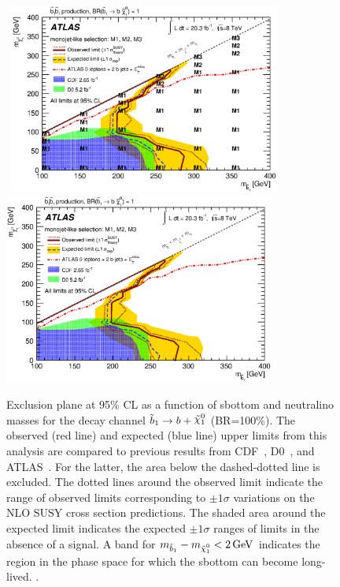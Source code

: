 \begin{figure}[!ht]
\begin{center}
\mbox{
\includegraphics[width=0.795\textwidth]{Interpretations/Figures/limitPlotSbottom_Stop_combined_M1_M2_M3_BestRegion.eps}
}
\mbox{
\includegraphics[width=0.795\textwidth]{Interpretations/Figures/limitPlotSbottom_Stop_combined_M1_M2_M3_.eps}
}
\end{center}
\caption[Exclusion plane at 95\% CL for sbottom pair production with $\sbottomtob$ as a function of the $m_{\sbottom}$ and $m_{\ninoone}$]{Exclusion plane at 95\% CL as a function of sbottom and neutralino masses for the decay channel $\sbottomtob$ (BR=100\%). The observed (red line) and expected (blue line) upper limits from this analysis are compared to previous results from CDF~\cite{Aaltonen:2010dy}, D0~\cite{Abazov:2010wq}, and ATLAS~\cite{Aad:2013ija}. For the latter, the area below the dashed-dotted line is excluded. The dotted lines around the observed limit indicate the range of observed limits corresponding to $\pm 1 \sigma$ variations on the NLO SUSY cross section predictions. The shaded area around the expected limit indicates the expected $\pm 1 \sigma$ ranges of limits in the absence of a signal. A band for $m_{\sbottomone} - m_{\ninoone}< \unit[2]{GeV}$  indicates the region in the phase space for which the sbottom can become long-lived. \protect\cite{Aad:2014nra}.}
\label{fig:ExclusionSbottomtob}
\end{figure}



